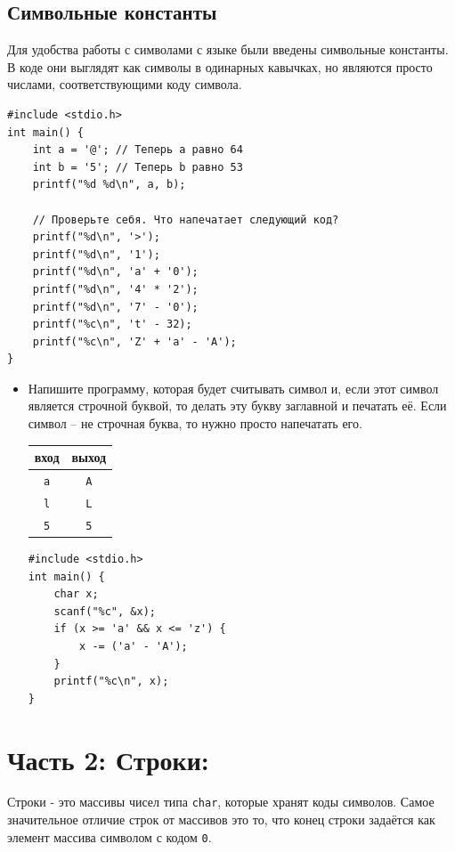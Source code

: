 \documentclass{article}
\begin{document}
\subsection*{Символьные константы}
Для удобства работы с символами с языке были введены символьные константы. В коде они выглядят как символы в одинарных кавычках, но являются просто числами, соответствующими коду символа.
\begin{lstlisting}
#include <stdio.h>
int main() {
    int a = '@'; // Теперь a равно 64
    int b = '5'; // Теперь b равно 53
    printf("%d %d\n", a, b);
	
    // Проверьте себя. Что напечатает следующий код?
    printf("%d\n", '>');
    printf("%d\n", '1');
    printf("%d\n", 'a' + '0');
    printf("%d\n", '4' * '2');
    printf("%d\n", '7' - '0');
    printf("%c\n", 't' - 32);
    printf("%c\n", 'Z' + 'a' - 'A');
}
\end{lstlisting}

\begin{itemize}
\item Напишите программу, которая будет считывать символ и, если этот символ является строчной буквой, то делать эту букву заглавной и печатать её. Если символ -- не строчная буква, то нужно просто напечатать его.
\begin{center}
\begin{tabular}{ c | c }
 вход & выход \\ \hline
 \texttt{a} & \texttt{A}  \\ 
 \texttt{l} & \texttt{L}  \\ 
 \texttt{5} & \texttt{5}  \\ 
\end{tabular}
\end{center}

\begin{lstlisting}[backgroundcolor = \color{solcolor}]
#include <stdio.h>
int main() {
    char x; 
    scanf("%c", &x);
    if (x >= 'a' && x <= 'z') {
        x -= ('a' - 'A');
    }
    printf("%c\n", x);
}
\end{lstlisting}
\end{itemize}


\section*{Часть 2: Строки:}
Строки - это массивы чисел типа \texttt{char}, которые хранят коды символов. Самое значительное отличие строк от массивов это то, что конец строки задаётся как элемент массива символом с кодом \texttt{0}. 
\end{document}
